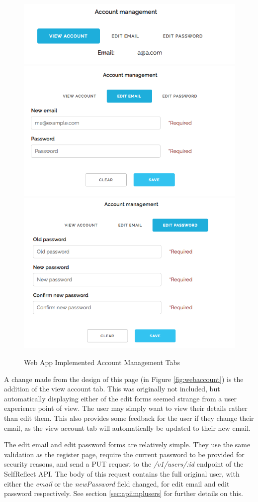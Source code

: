 \documentclass[11pt,openright,a4paper]{report}
\begin{document}
\begin{figure}[ht]
\centering
\caption{Web App Implemented Account Management Tabs}
\includegraphics[width=.48\textwidth]{i/webaccountviewtab.png} \\
\includegraphics[width=.48\textwidth]{i/webaccountemailtab.png} \hfill
\includegraphics[width=.48\textwidth]{i/webaccountpasswordtab.png}
\label{fig:webaccounttabs}
\end{figure}

\newpage
A change made from the design of this page (in Figure \ref{fig:webaccount}) is the addition of the view account tab. This was originally not included, but automatically displaying either of the edit forms seemed strange from a user experience point of view. The user may simply want to view their details rather than edit them. This also provides some feedback for the user if they change their email, as the view account tab will automatically be updated to their new email.

The edit email and edit password forms are relatively simple. They use the same validation as the register page, require the current password to be provided for security reasons, and send a PUT request to the \emph{/v1/users/:id} endpoint of the SelfReflect API. The body of this request contains the full original user, with either the \emph{email} or the \emph{newPassword} field changed, for edit email and edit password respectively. See section \ref{sec:apiimplusers} for further details on this.
\end{document}
